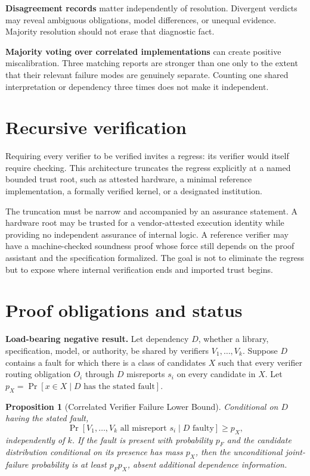 \documentclass[11pt,openany]{book}
\newtheorem{proposition}[definition]{Proposition}
\begin{document}
\textbf{Disagreement records} matter independently of resolution. Divergent
verdicts may reveal ambiguous obligations, model differences, or unequal
evidence. Majority resolution should not erase that diagnostic fact.

\textbf{Majority voting over correlated implementations} can create positive
miscalibration. Three matching reports are stronger than one only to the
extent that their relevant failure modes are genuinely separate. Counting one
shared interpretation or dependency three times does not make it independent.

\section{Recursive verification}

Requiring every verifier to be verified invites a regress: its verifier would
itself require checking. This architecture truncates the regress explicitly at
a named bounded trust root, such as attested hardware, a minimal reference
implementation, a formally verified kernel, or a designated institution.

The truncation must be narrow and accompanied by an assurance statement. A
hardware root may be trusted for a vendor-attested execution identity while
providing no independent assurance of internal logic. A reference verifier may
have a machine-checked soundness proof whose force still depends on the proof
assistant and the specification formalized. The goal is not to eliminate the
regress but to expose where internal verification ends and imported trust
begins.

\section{Proof obligations and status}

\textbf{Load-bearing negative result.} Let dependency \(D\), whether a
library, specification, model, or authority, be shared by verifiers
\(V_1,\ldots,V_k\). Suppose \(D\) contains a fault for which there is a class
of candidates \(X\) such that every verifier routing obligation \(O_i\)
through \(D\) misreports \(s_i\) on every candidate in \(X\). Let
\(p_X=\Pr[x\in X\mid D\text{ has the stated fault}]\).

\begin{proposition}[Correlated Verifier Failure Lower Bound]
Conditional on \(D\) having the stated fault,
\[
 \Pr[V_1,\ldots,V_k\text{ all misreport }s_i\mid D\text{ faulty}]
 \geq p_X,
\]
independently of \(k\). If the fault is present with probability \(p_F\) and
the candidate distribution conditional on its presence has mass \(p_X\), then
the unconditional joint-failure probability is at least \(p_Fp_X\), absent
additional dependence information.
\end{proposition}
\end{document}
